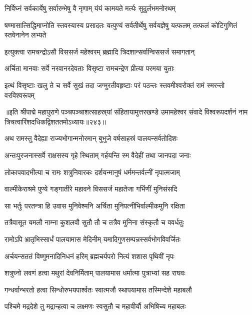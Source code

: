 \twolineshloka
{निर्विघ्नं सर्वकार्येषु सर्वारम्भेषु वै नृणाम्}
{यंयं कामयते मर्त्यः सुदुर्लभमनोरथम्}%


\threelineshloka
{षण्मासात्सिद्धिमाप्नोति स्तवस्यास्य प्रसादतः}
{यत्पुण्यं सर्वतीर्थेषु सर्वयज्ञेषु यत्फलम्}
{तत्फलं कोटिगुणितं स्तवेनानेन लभ्यते}%


\twolineshloka
{इत्युक्त्वा रामचन्द्रोऽसौ विससर्ज महेश्वरम्}
{ब्रह्मादि त्रिदशान्सर्वान्विससर्ज समागतान्}%

\twolineshloka
{अर्चिता मानवाः सर्वे नरवानरदेवताः}
{विसृष्टा रामचन्द्रेण प्रीत्या परमया युताः}%

\twolineshloka
{इत्थं विसृष्टाः खलु ते च सर्वे सुखं तदा जग्मुरतीवहृष्टाः}
{परं पठन्तः स्तवमीश्वरोक्तं रामं स्मरन्तो वरविश्वरूपम्}%

{॥इति श्रीपाद्मे महापुराणे पञ्चपञ्चाशत्साहस्र्यां संहितायामुत्तरखण्डे उमामहेश्वर संवादे विश्वरूपदर्शनं नाम त्रिचत्वारिंशदधिकद्विशततमोऽध्यायः॥२४३॥}



\twolineshloka
{अथ रामस्तु वैदेह्या राज्यभोगान्मनोरमान्}
{बुभुजे वर्षसाहस्रं पालयन्सर्वतोदिशः}%

\twolineshloka
{अन्तःपुरजनास्सर्वे राक्षसस्य गृहे स्थिताम्}
{गर्हयन्ति स्म वैदेहीं तथा जानपदा जनाः}%

\twolineshloka
{लोकापवादभीत्या च रामः शत्रुनिवारकः}
{दर्शयन्मानुषं धर्ममन्तर्वत्नीं नृपात्मजाम्}%

\twolineshloka
{वाल्मीकेराश्रमे पुण्ये गङ्गातीरे महावने}
{विससर्ज महातेजा गर्भिणीं मुनिसंसदि}%

\twolineshloka
{सा भर्तुः परतन्त्रा हि उवास मुनिवेश्मनि}
{अर्चिता मुनिपत्नीभिर्वाल्मीकमुनि रक्षिता}%

\twolineshloka
{तत्रैवासूत यमलौ नाम्ना कुशलवौ सुतौ}
{तौ च तत्रैव मुनिना संस्कृतौ च ववर्धतुः}%

\twolineshloka
{रामोऽपि भ्रातृभिस्सार्धं पालयामास मेदिनीम्}
{यमादिगुणसम्पन्नस्सर्वभोगविवर्जितः}%

\twolineshloka
{अर्चयन्सततं विष्णुमनादिनिधनं हरिम्}
{ब्रह्मचर्यपरो नित्यं शशास पृथिवीं नृपः}%

\twolineshloka
{शत्रुघ्नो लवणं हत्वा मथुरां देवनिर्मिताम्}
{पालयामास धर्मात्मा पुत्राभ्यां सह राघवः}%

\twolineshloka
{गन्धर्वान्भरतो हत्वा सिन्धोरुभयपार्श्वतः}
{स्वात्मजौ स्थापयामास तस्मिन्देशे महाबलौ}%

\twolineshloka
{पश्चिमे मद्रदेशे तु मद्रान्हत्वा च लक्ष्मणः}
{स्वसुतौ च महावीर्यौ अभिषिच्य महाबलः}%

